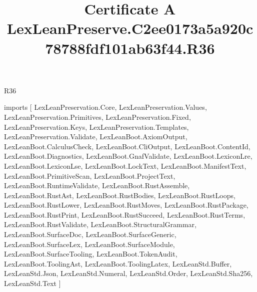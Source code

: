 \begin{lexlean}{R36}
\title{Certificate A LexLeanPreserve.C2ee0173a5a920c78788fdf101ab63f44.R36}
\begin{coremodule}
imports [
  LexLeanPreservation.Core,
  LexLeanPreservation.Values,
  LexLeanPreservation.Primitives,
  LexLeanPreservation.Fixed,
  LexLeanPreservation.Keys,
  LexLeanPreservation.Templates,
  LexLeanPreservation.Validate,
  LexLeanBoot.AxiomOutput,
  LexLeanBoot.CalculusCheck,
  LexLeanBoot.CliOutput,
  LexLeanBoot.ContentId,
  LexLeanBoot.Diagnostics,
  LexLeanBoot.GnafValidate,
  LexLeanBoot.LexiconLre,
  LexLeanBoot.LexiconLse,
  LexLeanBoot.LockText,
  LexLeanBoot.ManifestText,
  LexLeanBoot.PrimitiveScan,
  LexLeanBoot.ProjectText,
  LexLeanBoot.RuntimeValidate,
  LexLeanBoot.RustAssemble,
  LexLeanBoot.RustAst,
  LexLeanBoot.RustBodies,
  LexLeanBoot.RustLoops,
  LexLeanBoot.RustLower,
  LexLeanBoot.RustMoves,
  LexLeanBoot.RustPackage,
  LexLeanBoot.RustPrint,
  LexLeanBoot.RustSucceed,
  LexLeanBoot.RustTerms,
  LexLeanBoot.RustValidate,
  LexLeanBoot.StructuralGrammar,
  LexLeanBoot.SurfaceDoc,
  LexLeanBoot.SurfaceGeneric,
  LexLeanBoot.SurfaceLex,
  LexLeanBoot.SurfaceModule,
  LexLeanBoot.SurfaceTooling,
  LexLeanBoot.TokenAudit,
  LexLeanBoot.ToolingAst,
  LexLeanBoot.ToolingLatex,
  LexLeanStd.Buffer,
  LexLeanStd.Json,
  LexLeanStd.Numeral,
  LexLeanStd.Order,
  LexLeanStd.Sha256,
  LexLeanStd.Text
]


\end{coremodule}
\end{lexlean}
